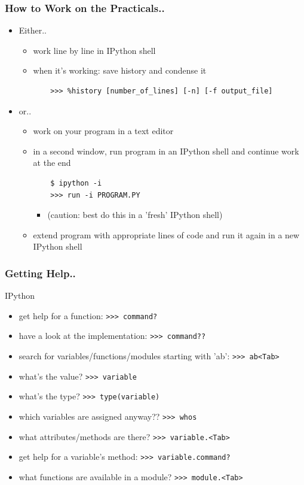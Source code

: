 \documentclass[t,10pt,compress=false,usepdftitle=false]{beamer}
\begin{document}
\begin{frame}[fragile]
    \frametitle{How to Work on the Practicals..}
    \begin{itemize}
    \item Either..
        \begin{itemize}
        \item work line by line in IPython shell
        \item when it's working: save history and condense it
    \begin{verbatim}
    >>> %history [number_of_lines] [-n] [-f output_file]
    \end{verbatim}
        \end{itemize}
    \item or..
        \begin{itemize}
        \item work on your program in a text editor
        \item in a second window, run program in an IPython shell and continue work at the end
    \begin{verbatim}
    $ ipython -i
    >>> run -i PROGRAM.PY
    \end{verbatim}
            \begin{itemize}
            \item (caution: best do this in a 'fresh' IPython shell)
            \end{itemize}
        \item extend program with appropriate lines of code and run it again in a new IPython shell
        \end{itemize}
    \end{itemize}
\end{frame}

\begin{frame}[fragile]
    \frametitle{Getting Help..}
    IPython
    \begin{itemize}
    \item get help for a function: \verb#>>> command?#
    \item have a look at the implementation: \verb#>>> command??#
    \item search for variables/functions/modules starting with 'ab': \verb#>>> ab<Tab>#
    \item what's the value? \verb#>>> variable#
    \item what's the type? \verb#>>> type(variable)#
    \item which variables are assigned anyway?? \verb#>>> whos#
    \item what attributes/methods are there? \verb#>>> variable.<Tab>#
    \item get help for a variable's method: \verb#>>> variable.command?#
    \item what functions are available in a module? \verb#>>> module.<Tab>#
    \end{itemize}
\end{frame}
\end{document}

